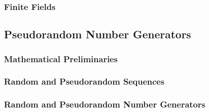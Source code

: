 \documentclass{stdlocal}
\begin{document}
      \begin{definition}

      \end{definition}

      \begin{definition}

      \end{definition}

      \begin{definition}

      \end{definition}

    \subsubsection*{Finite Fields} %
    \label{ssub:finite_fields}


  \subsection{Pseudorandom Number Generators} %
  \label{sub:pseudorandom_number_generators}
    \subsubsection*{Mathematical Preliminaries} %
    \label{ssub:mathematical_preliminaries}


    \subsubsection*{Random and Pseudorandom Sequences} %
    \label{ssub:random_and_pseudorandom_sequences}


    \subsubsection*{Random and Pseudorandom Number Generators} %
    \label{ssub:random_and_pseudorandom_number_generators}

\end{document}
